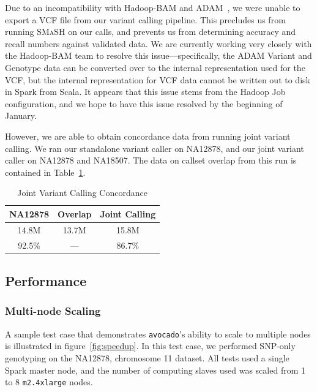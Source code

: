 \documentclass{acm_proc_article-sp}
\begin{document}

Due to an incompatibility with Hadoop-BAM and ADAM~\cite{massie13, niemenmaa12}, we were unable to export a VCF file from our variant
calling pipeline. This precludes us from running \textsc{SMaSH} on our calls, and prevents us from determining accuracy and recall numbers
against validated data. We are currently working very closely with the Hadoop-BAM team to resolve this issue---specifically, the ADAM Variant
and Genotype data can be converted over to the internal representation used for the VCF, but the internal representation for VCF data cannot
be written out to disk in Spark from Scala. It appears that this issue stems from the Hadoop Job configuration, and we hope to have this issue
resolved by the beginning of January.

However, we are able to obtain concordance data from running joint variant calling. We ran our standalone variant caller on NA12878, and
our joint variant caller on NA12878 and NA18507. The data on callset overlap from this run is contained in Table~\ref{tab:concordance}.

\begin{table}[h]
\caption{Joint Variant Calling Concordance}
\begin{center}
\begin{tabular}{| c | c | c |}
\hline
\bf NA12878 & \bf Overlap & \bf Joint Calling \\
\hline
\hline
14.8M & 13.7M & 15.8M \\
92.5\% & --- & 86.7\% \\
\hline
\end{tabular}
\end{center}
\label{tab:concordance}
\end{table}

\subsection{Performance}
\label{sec:performance}



\subsubsection{Multi-node Scaling}
\label{sec:multi-node-scaling}

A sample test case that demonstrates \texttt{avocado}'s ability to scale to multiple nodes is illustrated in figure~\ref{fig:speedup}. In this
test case, we performed SNP-only genotyping on the NA12878, chromosome 11 dataset. All tests used a single Spark master node, and
the number of computing slaves used was scaled from 1 to 8 \texttt{m2.4xlarge} nodes.
\end{document}
